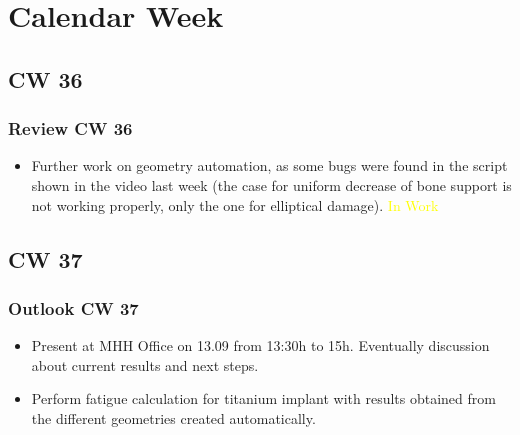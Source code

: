 \section{Calendar Week}
\subsection{CW 36}
\begin{frame}
  \frametitle{Review CW 36}
	\begin{itemize}
		\item Further work on geometry automation, as some bugs were found in the script shown in the video last week (the case for uniform decrease of bone support is not working properly, only the one for elliptical damage). \textcolor{yellow}{In Work}
	\end{itemize}
\end{frame}

\subsection{CW 37}
\begin{frame}
  \frametitle{Outlook CW 37}
	\begin{itemize}
		\item Present at MHH Office on 13.09 from 13:30h to 15h. Eventually discussion about current results and next steps.
		\item Perform fatigue calculation for titanium implant with results obtained from the different geometries created automatically.
	\end{itemize}
\end{frame}

